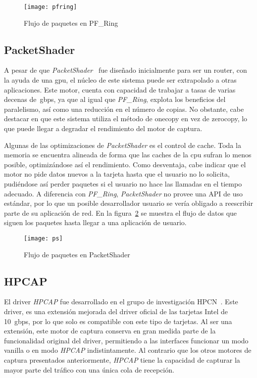 \begin{figure}[!bth]
\centering
\texttt{[image: pfring]}
\caption{Flujo de paquetes en PF\_Ring}
\label{fig:flow:pfring}
\end{figure}

\newpage
\subsection{PacketShader}
A pesar de que \textit{PacketShader}~\cite{dpdk:packetshader} fue diseñado inicialmente para ser un router, con la ayuda de una \gls{gpu}, el núcleo de este sistema puede ser extrapolado a otras aplicaciones.
Este motor, cuenta con capacidad de trabajar a tasas de varias decenas de~\gls{gbps}, ya que al igual que \textit{PF\_Ring}, explota los beneficios del paralelismo, así como una reducción en el número de copias. No obstante, cabe destacar en que este sistema utiliza el método de \gls{onecopy} en vez de \gls{zerocopy}, lo que puede llegar a degradar el rendimiento del motor de captura. 

Algunas de las optimizaciones de \textit{PacketShader} es el control de \gls{cache}. Toda la memoria se encuentra alineada de forma que las \glspl{cache} de la \gls{cpu} sufran lo menos posible, optimizándose así el rendimiento.
Como desventaja, cabe indicar que el motor no pide datos nuevos a la tarjeta hasta que el usuario no lo solicita, pudiéndose así perder paquetes si el usuario no hace las llamadas en el tiempo adecuado. A diferencia con \textit{PF\_Ring}, \textit{PacketShader} no provee una API de uso estándar, por lo que un posible desarrollador usuario se vería obligado a reescribir parte de su aplicación de red. 
En la figura~\ref{fig:flow:ps} se muestra el flujo de datos que siguen los paquetes hasta llegar a una aplicación de usuario.


\begin{figure}[!bth]
\centering
\texttt{[image: ps]}
\caption{Flujo de paquetes en PacketShader}
\label{fig:flow:ps}
\end{figure}

\newpage
\subsection{HPCAP}
El driver \textit{HPCAP} fue desarrollado en el grupo de investigación HPCN~\cite{moreno2012TFM}. Este driver, es una extensión mejorada del driver oficial de las tarjetas Intel de 10~\gls{gbps}, por lo que solo es compatible con este tipo de tarjetas. Al ser una extensión, este motor de captura conserva en gran medida parte de la funcionalidad original del driver, permitiendo a las interfaces funcionar un modo \gls{vanilla} o en modo \textit{HPCAP} indistintamente. Al contrario que los otros motores de captura presentados anteriormente, \textit{HPCAP} tiene la capacidad de capturar la mayor parte del tráfico con una única cola de recepción.

